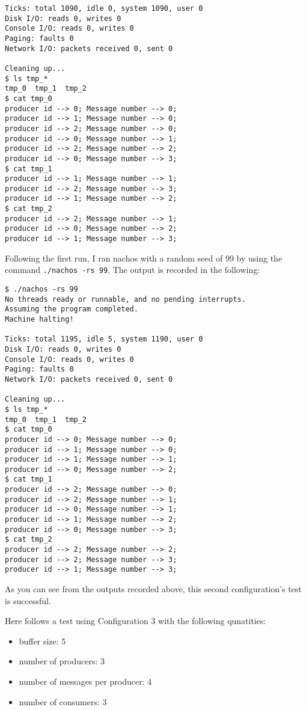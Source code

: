 \documentclass[11pt]{article}
\begin{document}
\begin{question}
\begin{subquestion}
\begin{verbatim}
Ticks: total 1090, idle 0, system 1090, user 0
Disk I/O: reads 0, writes 0
Console I/O: reads 0, writes 0
Paging: faults 0
Network I/O: packets received 0, sent 0

Cleaning up...
$ ls tmp_*
tmp_0  tmp_1  tmp_2
$ cat tmp_0
producer id --> 0; Message number --> 0;
producer id --> 1; Message number --> 0;
producer id --> 2; Message number --> 0;
producer id --> 0; Message number --> 1;
producer id --> 2; Message number --> 2;
producer id --> 0; Message number --> 3;
$ cat tmp_1
producer id --> 1; Message number --> 1;
producer id --> 2; Message number --> 3;
producer id --> 1; Message number --> 2;
$ cat tmp_2
producer id --> 2; Message number --> 1;
producer id --> 0; Message number --> 2;
producer id --> 1; Message number --> 3;
        \end{verbatim}

        Following the first run, I ran nachos with a random seed of 99 by using the command {\tt ./nachos -rs 99}. The output is recorded in the following:

        \begin{verbatim}
$ ./nachos -rs 99
No threads ready or runnable, and no pending interrupts.
Assuming the program completed.
Machine halting!

Ticks: total 1195, idle 5, system 1190, user 0
Disk I/O: reads 0, writes 0
Console I/O: reads 0, writes 0
Paging: faults 0
Network I/O: packets received 0, sent 0

Cleaning up...
$ ls tmp_*
tmp_0  tmp_1  tmp_2
$ cat tmp_0
producer id --> 0; Message number --> 0;
producer id --> 1; Message number --> 0;
producer id --> 1; Message number --> 1;
producer id --> 0; Message number --> 2;
$ cat tmp_1
producer id --> 2; Message number --> 0;
producer id --> 2; Message number --> 1;
producer id --> 0; Message number --> 1;
producer id --> 1; Message number --> 2;
producer id --> 0; Message number --> 3;
$ cat tmp_2
producer id --> 2; Message number --> 2;
producer id --> 2; Message number --> 3;
producer id --> 1; Message number --> 3;
        \end{verbatim}

        As you can see from the outputs recorded above, this second configuration's test is successful.
    \end{subquestion}
    \begin{subquestion}

        Here follows a test using Configuration 3 with the following qunatities:
        \begin{itemize}
            \item{buffer size: 5}
            \item{number of producers: 3}
            \item{number of messages per producer: 4}
            \item{number of consumers: 3}
        \end{itemize}


\end{subquestion}
\end{question}
\end{document}
